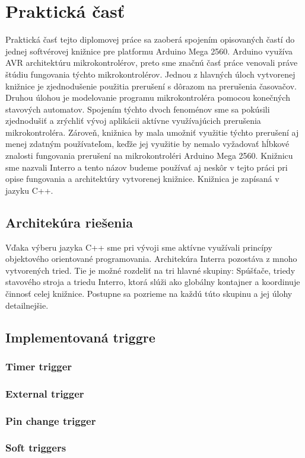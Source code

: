 \section{Praktická časť}
\noindent

Praktická časť tejto diplomovej práce sa zaoberá spojením opisovaných častí do jednej softvérovej knižnice pre platformu Arduino Mega 2560. Arduino využíva AVR
architektúru mikrokontrolérov, preto sme značnú časť práce venovali práve štúdiu fungovania týchto mikrokontrolérov.
Jednou z hlavných úloch vytvorenej knižnice je zjednodušenie použitia prerušení s dôrazom na prerušenia časovačov.
Druhou úlohou je modelovanie programu mikrokontroléra pomocou konečných stavových automatov. Spojením týchto dvoch fenoménov sme sa pokúsili zjednodušiť
a zrýchliť vývoj aplikácii aktívne využívajúcich prerušenia mikrokontroléra. Zároveň, knižnica by mala umožniť využitie týchto prerušení aj menej zdatným
používateľom, keďže jej využitie by nemalo vyžadovať hĺbkové znalosti fungovania prerušení na mikrokontroléri Arduino Mega 2560. Knižnicu sme nazvali Interro
a tento názov budeme používať aj neskôr v tejto práci pri opise fungovania a architektúry vytvorenej knižnice. Knižnica je zapísaná v jazyku C++.

\subsection{Architekúra riešenia}
Vďaka výberu jazyka C++ sme pri vývoji sme aktívne využívali princípy objektového orientované programovania. Architekúra Interra pozostáva z mnoho vytvorených tried.
Tie je možné rozdeliť na tri hlavné skupiny: Spúšťače, triedy stavového stroja a triedu Interro, ktorá slúži ako globálny kontajner a koordinuje činnosť celej knižnice.
Postupne sa pozrieme na každú túto skupinu a jej úlohy detailnejšie.

\subsection{Implementovaná triggre}

\subsubsection{Timer trigger}

\subsubsection{External trigger}

\subsubsection{Pin change trigger}

\subsubsection{Soft triggers}
